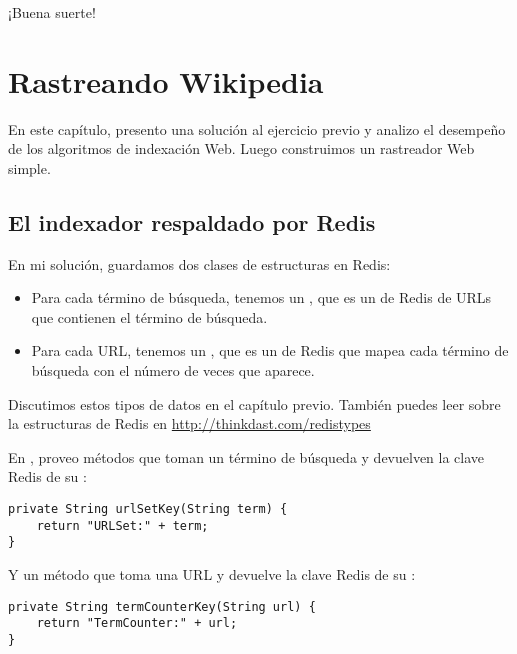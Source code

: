 \documentclass[12pt]{book}
\theoremstyle{exercise}
\begin{document}
¡Buena suerte!



\chapter{Rastreando Wikipedia}

En este capítulo, presento una solución al ejercicio previo y
analizo el desempeño de los algoritmos de indexación Web. Luego
construimos un rastreador Web simple.

\section{El indexador respaldado por Redis}
\label{redis-indexer}


En mi solución, guardamos dos clases de estructuras en Redis:

\begin{itemize}

\item
  Para cada término de búsqueda, tenemos un , que es un  de Redis
  de URLs que contienen el término de búsqueda.

\item
  Para cada URL, tenemos un , que es un  de Redis
  que mapea cada término de búsqueda con el número de veces que aparece.

\end{itemize}

Discutimos estos tipos de datos en el capítulo previo. También puedes
leer sobre la estructuras de Redis en \url{http://thinkdast.com/redistypes}


En , proveo métodos que toman un término de búsqueda y
devuelven la clave Redis de su :

\begin{verbatim}
private String urlSetKey(String term) {
    return "URLSet:" + term;
}
\end{verbatim}

Y un método que toma una URL y devuelve la clave Redis de su
:

\begin{verbatim}
private String termCounterKey(String url) {
    return "TermCounter:" + url;
}
\end{verbatim}
\end{document}
